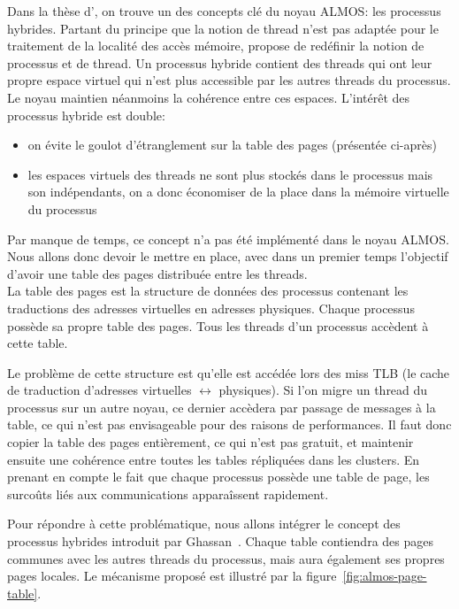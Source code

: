      Dans la thèse d'\citet{almaless2014universite}, on trouve un des concepts
      clé du noyau ALMOS: les processus hybrides. Partant du principe que la
      notion de thread n'est pas adaptée pour le traitement de la localité des
      accès mémoire,\citeauthor{almaless2014universite} propose de redéfinir la
      notion de processus et de thread. Un processus hybride contient des
      threads qui ont leur propre espace virtuel qui n'est plus accessible par
      les autres threads du processus. Le noyau maintien néanmoins la cohérence
      entre ces espaces. L'intérêt des processus hybride est double:
      \begin{itemize}
        \item on évite le goulot d'étranglement sur la table des pages
          (présentée ci-après)
        \item les espaces virtuels des threads ne sont plus stockés dans le
          processus mais son indépendants, on a donc économiser de la place dans
          la mémoire virtuelle du processus
      \end{itemize}

      Par manque de temps, ce concept n'a pas été implémenté dans le noyau
      ALMOS. Nous allons donc devoir le mettre en place, avec dans un premier
      temps l'objectif d'avoir une table des pages distribuée entre les
      threads.\\

      La table des pages est la structure de données des processus contenant les
      traductions des adresses virtuelles en adresses physiques. Chaque
      processus possède sa propre table des pages. Tous les threads d'un
      processus accèdent à cette table.

      Le problème de cette structure est qu'elle est accédée lors des miss TLB
      (le cache de traduction d'adresses virtuelles $\leftrightarrow$
      physiques). Si l'on migre un thread du processus sur un autre noyau, ce
      dernier accèdera par passage de messages à la table, ce qui n'est pas
      envisageable pour des raisons de performances. Il faut donc copier la
      table des pages entièrement, ce qui n'est pas gratuit, et maintenir
      ensuite une cohérence entre toutes les tables répliquées dans les
      clusters. En prenant en compte le fait que chaque processus possède une
      table de page, les surcoûts liés aux communications apparaîssent
      rapidement.

      Pour répondre à cette problématique, nous allons intégrer le concept des
      processus hybrides introduit par
      Ghassan~\citeauthor{almaless2014universite}. Chaque table contiendra des
      pages communes avec les autres threads du processus, mais aura également
      ses propres pages locales. Le mécanisme proposé est illustré par la
      figure~\ref{fig:almos-page-table}.

